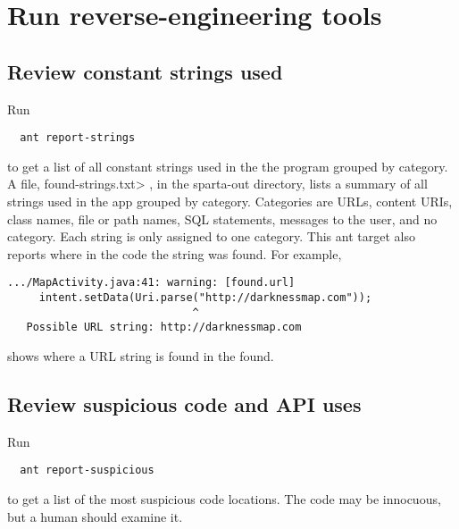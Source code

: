 \section{Run reverse-engineering tools\label{sec:reverse-engineering}}

\subsection{Review constant strings used}
\label{sec:appanalysis/strings}

Run

\begin{Verbatim}
  ant report-strings
\end{Verbatim}
\noindent
to get a list of all constant strings used in the the program grouped by
category.  A file, \<found-strings.txt> ,  in the sparta-out directory, lists a
summary of all strings used in the app grouped by category.   Categories are
URLs, content URIs, class names, file or path names, SQL statements, messages
to the user, and no category.  Each string is only assigned to one category.
This ant target also reports where in the code the string was found. For
example,
 
\begin{Verbatim}
.../MapActivity.java:41: warning: [found.url] 
 	 intent.setData(Uri.parse("http://darknessmap.com"));
 	                         ^
   Possible URL string: http://darknessmap.com 
\end{Verbatim}
\noindent
shows where a URL string is found in the found.  

\subsection{Review suspicious code and API uses}
\label{sec:appanalysis/suspicious}

Run

\begin{Verbatim}
  ant report-suspicious
\end{Verbatim}

\noindent
to get a list of the most suspicious code
locations. 
The code may be innocuous, but a human should examine it.

